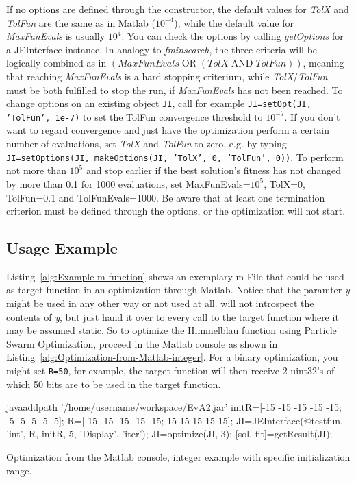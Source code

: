 If no options are defined through the constructor, the default values
for \emph{TolX} and \emph{TolFun} are the same as in Matlab ($10^{-4}$),
while the default value for \emph{MaxFunEvals} is usually $10^{4}$.
You can check the options by calling \emph{getOptions} for a JEInterface
instance. In analogy to \emph{fminsearch}, the three criteria will
be logically combined as in $(MaxFunEvals\;\mathrm{OR}\;(TolX\;\mathrm{AND}\; TolFun))$,
meaning that reaching \emph{MaxFunEvals} is a hard stopping criterium,
while \emph{TolX}/\emph{TolFun} must be both fulfilled to stop the
run, if \emph{MaxFunEvals} has not been reached. To change options
on an existing object \texttt{JI}, call for example \texttt{JI=setOpt(JI,
'TolFun', 1e-7)} to set the TolFun convergence threshold to $10^{-7}$.
If you don't want to regard convergence and just have the optimization
perform a certain number of evaluations, set \emph{TolX} and \emph{TolFun}
to zero, e.g. by typing \texttt{JI=setOptions(JI, makeOptions(JI,
'TolX', 0, 'TolFun', 0))}. To perform not more than $10^{5}$ and
stop earlier if the best solution's fitness has not changed by more
than 0.1 for 1000 evaluations, set MaxFunEvals=$10^{5}$, TolX=0,
TolFun=0.1 and TolFunEvals=1000. Be aware that at least one termination
criterion must be defined through the options, or the optimization
will not start. 


\subsection{Usage Example}

Listing~\ref{alg:Example-m-function} shows an exemplary m-File that
could be used as target function in an optimization through Matlab.
Notice that the paramter \emph{y} might be used in any other way or
not used at all.  will not introspect the contents of \emph{y},
but just hand it over to every call to the target function where it
may be assumed static. So to optimize the Himmelblau function using
Particle Swarm Optimization, proceed in the Matlab console as shown
in Listing~\ref{alg:Optimization-from-Matlab-integer}. For a binary
optimization, you might set \texttt{R=50}, for example, the target
function will then receive 2 uint32's of which 50 bits are to be used
in the target function. 

\begin{algorithm}
\begin{mylstenv}
javaaddpath '/home/username/workspace/EvA2.jar'
initR=[-15 -15 -15 -15 -15; -5 -5 -5 -5 -5]; 
R=[-15 -15 -15 -15 -15; 15 15 15 15 15]; 
JI=JEInterface(@testfun, 'int', R, initR, 5, 'Display', 'iter');  %
JI=optimize(JI, 3);  %
[sol, fit]=getResult(JI); 
\end{mylstenv}

\caption{Optimization from the Matlab console, integer example with specific
initialization range.\label{alg:Optimization-from-Matlab-integer}}
\end{algorithm}


